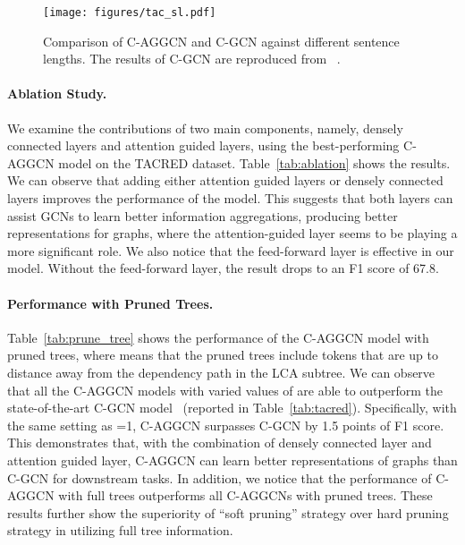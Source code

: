 \documentclass[11pt,a4paper]{article}
\begin{document}
\begin{figure}[!t]
    \centering
    \texttt{[image: figures/tac\_sl.pdf]}
\caption{Comparison of C-AGGCN and C-GCN against different sentence lengths. The results of C-GCN are reproduced from ~\cite{Zhang2018GraphCO}.}
    \label{fig:tac_sl}
\end{figure}


\paragraph{Ablation Study.} We examine the contributions of two main components, namely, densely connected layers and attention guided layers, using the best-performing C-AGGCN model on the TACRED dataset.  Table~\ref{tab:ablation} shows the results. We can observe that adding either attention guided layers or densely connected layers improves the performance of the model. This suggests that both layers can assist GCNs to learn better information aggregations, producing better representations for graphs, where the attention-guided layer seems to be playing a more significant role.  We also notice that the feed-forward layer is  effective in our model. Without the feed-forward layer, the result drops to an F1 score of 67.8.



\paragraph{Performance with Pruned Trees.} Table~\ref{tab:prune_tree} shows the performance of the C-AGGCN model with pruned trees, where  means that the pruned trees include tokens that are up to distance  away from the dependency path in the  LCA subtree. We can observe that all the C-AGGCN models with varied values of  are able to outperform the state-of-the-art C-GCN model~\citep{Zhang2018GraphCO} (reported in Table~\ref{tab:tacred}). Specifically,  with the same setting as =1, C-AGGCN surpasses C-GCN by 1.5 points of F1 score. This demonstrates that, with the combination of densely connected layer and attention guided layer,  C-AGGCN  can learn better representations of graphs than C-GCN for downstream tasks. In addition, we notice that the performance of C-AGGCN with full trees outperforms all C-AGGCNs with pruned trees. These results further show  the superiority of ``soft pruning'' strategy   over hard pruning strategy in utilizing full tree information.
\end{document}
